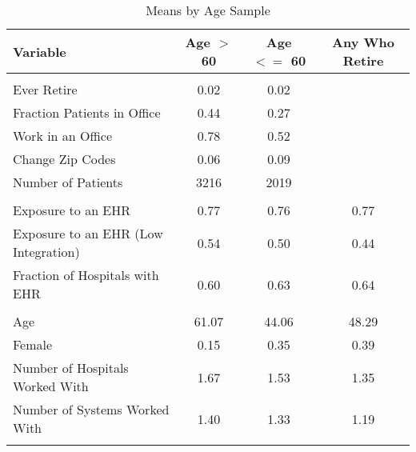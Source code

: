 \begin{table}[ht]

\caption{Means by Age Sample}
\centering
\begin{tabular}[t]{lccc}
\toprule
Variable & Age $>$ 60 & Age $<=$ 60 & Any Who Retire\\
\midrule
\addlinespace[0.3em]
\multicolumn{4}{l}{\textbf{Outcomes}}\\
\hspace{1em}Ever Retire & 0.02 & 0.02 & \\
\hspace{1em}Fraction Patients in Office & 0.44 & 0.27 & \\
\hspace{1em}Work in an Office & 0.78 & 0.52 &\\
\hspace{1em}Change Zip Codes & 0.06 & 0.09 &\\
\hspace{1em}Number of Patients & 3216 & 2019 &\\
\addlinespace[0.3em]
\multicolumn{4}{l}{\textbf{Treatment}}\\
\hspace{1em}Exposure to an EHR & 0.77 & 0.76 & 0.77\\
\hspace{1em}Exposure to an EHR (Low Integration) & 0.54 & 0.50 & 0.44\\
\hspace{1em}Fraction of Hospitals with EHR & 0.60 & 0.63 & 0.64\\
\addlinespace[0.3em]
\multicolumn{4}{l}{\textbf{Characteristics}}\\
\hspace{1em}Age & 61.07 & 44.06 & 48.29\\
\hspace{1em}Female & 0.15 & 0.35 & 0.39\\
\hspace{1em}Number of Hospitals Worked With & 1.67 & 1.53 & 1.35\\
\hspace{1em}Number of Systems Worked With & 1.40 & 1.33 & 1.19\\
\bottomrule
\label{tab:splitstats}
\end{tabular}
\end{table}
